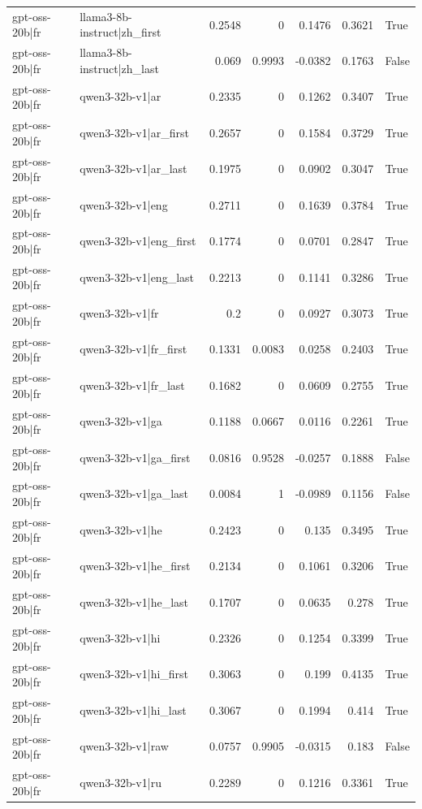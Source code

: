 \begin{table}
\begin{tabular}{l l r r r r l}
gpt-oss-20b|fr & llama3-8b-instruct|zh_first & 0.2548 & 0 & 0.1476 & 0.3621 & True \\
gpt-oss-20b|fr & llama3-8b-instruct|zh_last & 0.069 & 0.9993 & -0.0382 & 0.1763 & False \\
gpt-oss-20b|fr & qwen3-32b-v1|ar & 0.2335 & 0 & 0.1262 & 0.3407 & True \\
gpt-oss-20b|fr & qwen3-32b-v1|ar_first & 0.2657 & 0 & 0.1584 & 0.3729 & True \\
gpt-oss-20b|fr & qwen3-32b-v1|ar_last & 0.1975 & 0 & 0.0902 & 0.3047 & True \\
gpt-oss-20b|fr & qwen3-32b-v1|eng & 0.2711 & 0 & 0.1639 & 0.3784 & True \\
gpt-oss-20b|fr & qwen3-32b-v1|eng_first & 0.1774 & 0 & 0.0701 & 0.2847 & True \\
gpt-oss-20b|fr & qwen3-32b-v1|eng_last & 0.2213 & 0 & 0.1141 & 0.3286 & True \\
gpt-oss-20b|fr & qwen3-32b-v1|fr & 0.2 & 0 & 0.0927 & 0.3073 & True \\
gpt-oss-20b|fr & qwen3-32b-v1|fr_first & 0.1331 & 0.0083 & 0.0258 & 0.2403 & True \\
gpt-oss-20b|fr & qwen3-32b-v1|fr_last & 0.1682 & 0 & 0.0609 & 0.2755 & True \\
gpt-oss-20b|fr & qwen3-32b-v1|ga & 0.1188 & 0.0667 & 0.0116 & 0.2261 & True \\
gpt-oss-20b|fr & qwen3-32b-v1|ga_first & 0.0816 & 0.9528 & -0.0257 & 0.1888 & False \\
gpt-oss-20b|fr & qwen3-32b-v1|ga_last & 0.0084 & 1 & -0.0989 & 0.1156 & False \\
gpt-oss-20b|fr & qwen3-32b-v1|he & 0.2423 & 0 & 0.135 & 0.3495 & True \\
gpt-oss-20b|fr & qwen3-32b-v1|he_first & 0.2134 & 0 & 0.1061 & 0.3206 & True \\
gpt-oss-20b|fr & qwen3-32b-v1|he_last & 0.1707 & 0 & 0.0635 & 0.278 & True \\
gpt-oss-20b|fr & qwen3-32b-v1|hi & 0.2326 & 0 & 0.1254 & 0.3399 & True \\
gpt-oss-20b|fr & qwen3-32b-v1|hi_first & 0.3063 & 0 & 0.199 & 0.4135 & True \\
gpt-oss-20b|fr & qwen3-32b-v1|hi_last & 0.3067 & 0 & 0.1994 & 0.414 & True \\
gpt-oss-20b|fr & qwen3-32b-v1|raw & 0.0757 & 0.9905 & -0.0315 & 0.183 & False \\
gpt-oss-20b|fr & qwen3-32b-v1|ru & 0.2289 & 0 & 0.1216 & 0.3361 & True \\

\end{tabular}
\end{table}
